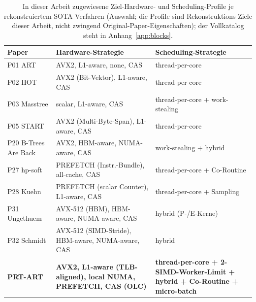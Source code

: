 \begin{table}[!htbp]
  \centering\small
  \caption{In dieser Arbeit zugewiesene Ziel-Hardware- und Scheduling-Profile je rekonstruiertem SOTA-Verfahren (Auswahl; die Profile sind Rekonstruktions-Ziele dieser Arbeit, nicht zwingend Original-Paper-Eigenschaften); der Vollkatalog steht in Anhang~\ref{app:blocks}.}\label{tab:hw-sched}
  \begin{tabular}{@{}l p{4.6cm} p{5.6cm}@{}}
    \toprule
    \textbf{Paper} & \textbf{Hardware-Strategie} & \textbf{Scheduling-Strategie} \\
    \midrule
    P01 ART & AVX2, L1-aware, none, CAS & thread-per-core \\
    P02 HOT & AVX2 (Bit-Vektor), L1-aware, CAS & thread-per-core \\
    P03 Masstree & scalar, L1-aware, CAS & thread-per-core + work-stealing \\
    P05 START & AVX2 (Multi-Byte-Span), L1-aware, CAS & thread-per-core \\
    P20 B-Trees Are Back & AVX2, HBM-aware, NUMA-aware, CAS & work-stealing + hybrid \\
    P27 hp-soft & PREFETCH (Instr.-Bundle), all-cache, CAS & thread-per-core + Co-Routine \\
    P28 Kuehn & PREFETCH (scalar Counter), L1-aware, CAS & thread-per-core + Sampling \\
    P31 Ungethuem & AVX-512 (HBM), HBM-aware, NUMA-aware, CAS & hybrid (P-/E-Kerne) \\
    P32 Schmidt & AVX-512 (SIMD-Stride), HBM-aware, NUMA-aware, CAS & hybrid \\
    \midrule
    \textbf{PRT-ART} & \textbf{AVX2, L1-aware (TLB-aligned), local NUMA, PREFETCH, CAS (OLC)} & \textbf{thread-per-core + 2-SIMD-Worker-Limit + hybrid + Co-Routine + micro-batch} \\
    \bottomrule
  \end{tabular}
\end{table}

